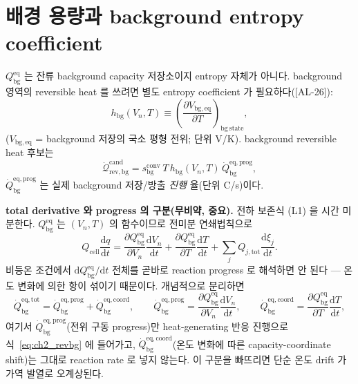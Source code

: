 \documentclass[11pt,a4paper]{article}
\newcommand{\dd}{\mathrm{d}}
\newcommand{\eq}{\mathrm{eq}}
\newcommand{\bg}{\mathrm{bg}}
\newcommand{\cell}{\mathrm{cell}}
\newcommand{\tot}{\mathrm{tot}}
\newcommand{\rev}{\mathrm{rev}}
\newcommand{\cand}{\mathrm{cand}}
\newcommand{\conv}{\mathrm{conv}}
\newcommand{\prog}{\mathrm{prog}}
\newcommand{\coord}{\mathrm{coord}}
\newcommand{\AL}[1]{\textsf{[AL-#1]}}
\begin{document}
\section{배경 용량과 background entropy coefficient}\label{sec:ch2_bg}
$Q_\bg^{\eq}$ 는 잔류 background capacity 저장소이지 entropy 자체가 아니다. background 영역의 reversible heat 를
쓰려면 별도 entropy coefficient 가 필요하다(\AL{26}):
\begin{equation}
h_\bg(V_n,T)\equiv\left(\frac{\partial V_{\bg,\eq}}{\partial T}\right)_{\mathrm{bg\ state}},
\label{eq:ch2_hbg}
\end{equation}
($V_{\bg,\eq}$ = background 저장의 국소 평형 전위; 단위 V/K). background reversible heat 후보는
\begin{equation}
\dot{\mathcal Q}_{\rev,\bg}^{\cand}=s_\bg^{\conv}\,T\,h_\bg(V_n,T)\,\dot Q_\bg^{\eq,\prog},
\label{eq:ch2_revbg}
\end{equation}
$\dot Q_\bg^{\eq,\prog}$ 는 실제 background 저장/방출 \emph{진행} 율(단위 C/s)이다.

\textbf{total derivative 와 progress 의 구분(무비약, 중요).} 전하 보존식 (L1) 을 시간 미분한다. $Q_\bg^{\eq}$ 는
$(V_n,T)$ 의 함수이므로 전미분 연쇄법칙으로
\begin{equation}
Q_\cell\frac{\dd q}{\dd t}=\frac{\partial Q_\bg^{\eq}}{\partial V_n}\frac{\dd V_n}{\dd t}+\frac{\partial Q_\bg^{\eq}}{\partial T}\frac{\dd T}{\dd t}
+\sum_jQ_{j,\tot}\frac{\dd\xi_j}{\dd t}.
\label{eq:ch2_dQdt}
\end{equation}
비등온 조건에서 $\dd Q_\bg^{\eq}/\dd t$ 전체를 곧바로 reaction progress 로 해석하면 안 된다 — 온도 변화에 의한 항이
섞이기 때문이다. 개념적으로 분리하면
\begin{equation}
\dot Q_\bg^{\eq,\mathrm{tot}}=\dot Q_\bg^{\eq,\prog}+\dot Q_\bg^{\eq,\coord},\qquad
\dot Q_\bg^{\eq,\prog}=\frac{\partial Q_\bg^{\eq}}{\partial V_n}\frac{\dd V_n}{\dd t},\qquad
\dot Q_\bg^{\eq,\coord}=\frac{\partial Q_\bg^{\eq}}{\partial T}\frac{\dd T}{\dd t},
\label{eq:ch2_bgsplit}
\end{equation}
여기서 $\dot Q_\bg^{\eq,\prog}$(전위 구동 progress)만 heat-generating 반응 진행으로 식~\eqref{eq:ch2_revbg} 에
들어가고, $\dot Q_\bg^{\eq,\coord}$(온도 변화에 따른 capacity-coordinate shift)는 그대로 reaction rate 로 넣지
않는다. 이 구분을 빠뜨리면 단순 온도 drift 가 가역 발열로 오계상된다.

\end{document}
